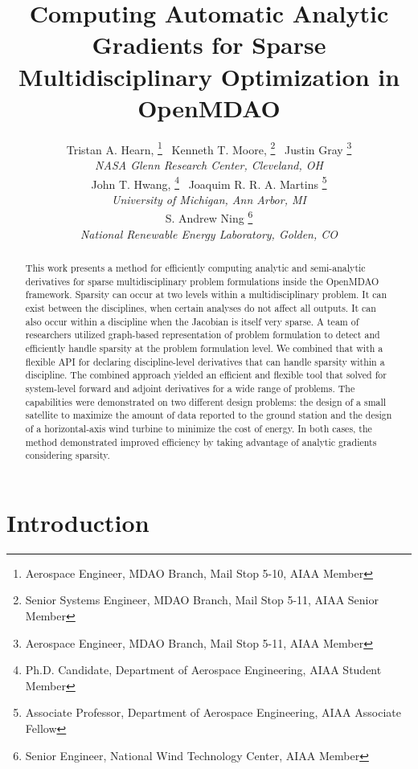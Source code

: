 \documentclass[]{aiaa-tc} %
\title{Computing Automatic Analytic Gradients for Sparse Multidisciplinary Optimization in OpenMDAO}
\author{
  Tristan A. Hearn,%
     \thanks{Aerospace Engineer, MDAO Branch, Mail Stop 5-10, AIAA Member}
  \ Kenneth T. Moore,%
     \thanks{Senior Systems Engineer, MDAO Branch, Mail Stop 5-11, AIAA Senior Member}
  \ Justin Gray%
     \thanks{Aerospace Engineer, MDAO Branch, Mail Stop 5-11, AIAA Member}
   \\
  {\normalsize\itshape
  NASA Glenn Research Center, Cleveland, OH}  \\
  John T. Hwang,%
  \thanks{Ph.D. Candidate, Department of Aerospace Engineering, AIAA Student Member}
  \ Joaquim R. R. A. Martins%
  \thanks{Associate Professor, Department of Aerospace Engineering, AIAA Associate Fellow}
  \\
  {\normalsize\itshape
   University of Michigan, Ann Arbor, MI}\\
  S. Andrew Ning
    \thanks{Senior Engineer, National Wind Technology Center, AIAA Member}
  \\
  {\normalsize\itshape
   National Renewable Energy Laboratory, Golden, CO}
}
\begin{document}
  \maketitle

  \begin{abstract}

  This work presents a method for efficiently computing analytic and semi-analytic derivatives for sparse multidisciplinary
  problem formulations inside the OpenMDAO framework. Sparsity can occur at two levels within a multidisciplinary problem.
  It can exist between the disciplines, when certain analyses do not affect all outputs. It can also occur within a discipline when
  the Jacobian is itself very sparse. A team of researchers utilized graph-based representation of problem formulation to detect and efficiently
  handle sparsity at the problem formulation level. We combined that with a flexible API for declaring discipline-level derivatives
  that can handle sparsity within a discipline. The combined approach yielded an efficient and flexible tool that solved
  for system-level forward and adjoint derivatives for a wide range of problems. The capabilities
  were demonstrated on two different design problems: the design of a small satellite to maximize the amount of data reported
  to the ground station and the design of a horizontal-axis wind turbine to minimize the cost of energy. In both cases, the
  method demonstrated improved efficiency by taking advantage of analytic gradients considering sparsity.

  \end{abstract}

  \section{Introduction}
\end{document}
